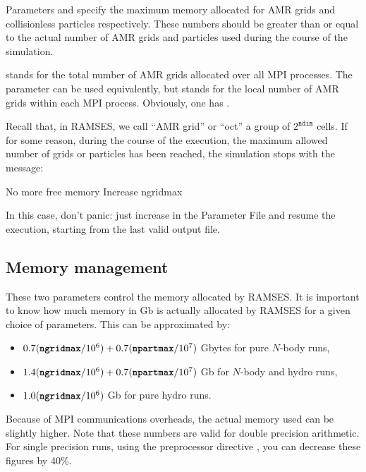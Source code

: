 
Parameters  and  specify the
maximum memory allocated for AMR grids and collisionless particles
respectively. These numbers should be greater than or equal to the
actual number of AMR grids and particles used during the course of the
simulation. 

 stands for the total number of AMR grids allocated
over all MPI processes. The  parameter can be used
equivalently, but stands for the local number of AMR grids within each
MPI process. Obviously, one has .

\begin{warning}
Recall that, in RAMSES, we call ``AMR grid'' or ``oct'' a group of
$2^{\mathtt{ndim}}$ cells. If for some reason, during the course of the
execution, the maximum allowed number of grids or particles has been
reached, the simulation stops with the message:
%
\begin{Prompt}
 No more free memory
 Increase ngridmax
\end{Prompt}
%
In this case, don't panic: just increase  in the
Parameter File and resume the execution, starting from the last 
valid output file. 
\end{warning}


\subsection{Memory management}

These two parameters control the memory allocated by RAMSES. It is
important to know how much memory in Gb is actually allocated by RAMSES
for a given choice of parameters. This can be approximated by:

\begin{itemize}
\item $0.7 (\nmlentry{ngridmax}/10^6) + 0.7 (\nmlentry{npartmax}/10^7)$
Gbytes for pure $N$-body runs,
\item $1.4 (\nmlentry{ngridmax}/10^6) + 0.7 (\nmlentry{npartmax}/10^7)$
Gb for $N$-body and hydro runs,
\item $1.0 (\nmlentry{ngridmax}/10^6)$ Gb for pure hydro runs. 
\end{itemize}

Because of MPI communications overheads, the actual memory used can be
slightly higher. Note that these numbers are valid for double precision
arithmetic. For single precision runs, using the preprocessor directive
, you can decrease these figures by 40\%. 

